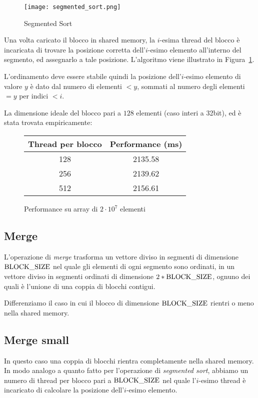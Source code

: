 \begin{figure}[H]
\centering
	\texttt{[image: segmented\_sort.png]}
	\caption{Segmented Sort}
	\label{segmented_sort}
\end{figure}

Una volta caricato il blocco in shared memory, la $i$-esima thread del blocco è incaricata di trovare la posizione corretta dell'$i$-esimo elemento all'interno del segmento, ed assegnarlo a tale posizione. L'algoritmo viene illustrato in Figura~\ref{segmented_sort}. 

L'ordinamento deve essere stabile quindi la posizione dell'$i$-esimo elemento di valore $y$ è dato dal numero di elementi $<y$, sommati al numero degli elementi $=y$ per indici $<i$. 

La dimensione ideale del blocco pari a $128$ elementi (caso interi a 32bit), ed è stata trovata empiricamente:
\begin{figure}[H]
	\centering
	\begin{tabular}{SS}
		\toprule
		\textbf{Thread per blocco} & \textbf{Performance (\si{\milli\second})} \\   & 2135.58 \\
		256  & 2139.62 \\
		512  & 2156.61  \\ \bottomrule
	\end{tabular}
	\caption{Performance su array di $2\cdot 10^7$ elementi}
\end{figure}

\subsection{Merge}
\label{merge}
L'operazione di \emph{merge} trasforma un vettore diviso in segmenti di dimensione $\textrm{BLOCK\_SIZE}$ nel quale gli elementi di ogni segmento sono ordinati, in un vettore diviso in segmenti ordinati di dimensione $2 * \textrm{BLOCK\_SIZE}$, ognuno dei quali è l'unione di una coppia di blocchi contigui. 

Differenziamo il caso in cui il blocco di dimensione $\textrm{BLOCK\_SIZE}$ rientri o meno nella shared memory. 

\subsection{Merge small}

In questo caso una coppia di blocchi rientra completamente nella shared memory. In modo analogo a quanto fatto per l'operazione di \emph{segmented sort}, abbiamo un numero di thread per blocco pari a $\textrm{BLOCK\_SIZE}$ nel quale l'$i$-esimo thread è incaricato di calcolare la posizione dell'$i$-esimo elemento. 

